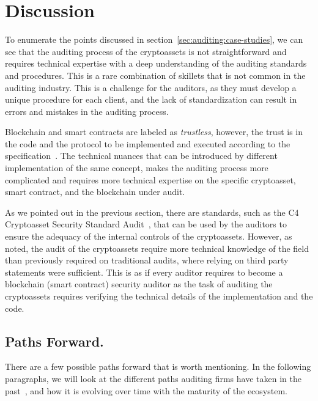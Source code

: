 \section{Discussion} \label{sec:auditing:discussion}
To enumerate the points discussed in section~\ref{sec:auditing:case-studies}, we can see that the auditing process of the cryptoassets is not straightforward and requires technical expertise with a deep understanding of the auditing standards and procedures. This is a rare combination of skillets that is not common in the auditing industry. This is a challenge for the auditors, as they must develop a unique procedure for each client, and the lack of standardization can result in errors and mistakes in the auditing process.

Blockchain and smart contracts are labeled as \textit{trustless}, however, the trust is in the code and the protocol to be implemented and executed according to the specification~\cite{gaggioli2019middleman}. The technical nuances that can be introduced by different implementation of the same concept, makes the auditing process more complicated and requires more technical expertise on the specific cryptoasset, smart contract, and the blockchain under audit.

As we pointed out in the previous section, there are standards, such as the C4 Cryptoasset Security Standard Audit~\cite{c4ccssa}, that can be used by the auditors to ensure the adequacy of the internal controls of the cryptoassets. However, as noted, the audit of the cryptoassets require more technical knowledge of the field than previously required on traditional audits, where relying on third party statements were sufficient. This is as if every auditor requires to become a blockchain (smart contract) security auditor as the task of auditing the cryptoassets requires verifying the technical details of the implementation and the code.

\subsection{Paths Forward.} 
There are a few possible paths forward that is worth mentioning. In the following paragraphs, we will look at the different paths auditing firms have taken in the past~\cite{pimentel2020blockchain,garanina2022blockchain}, and how it is evolving over time with the maturity of the ecosystem.

